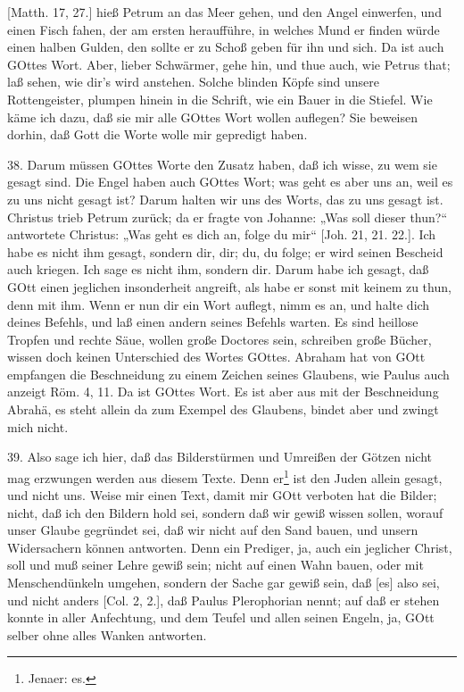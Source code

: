 [Matth. 17, 27.] hieß Petrum an das Meer gehen, und den Angel einwerfen, und einen Fisch fahen, der am ersten heraufführe, in welches Mund er finden würde einen halben Gulden, den sollte er zu Schoß geben für ihn und sich. Da ist auch GOttes Wort. Aber, lieber Schwärmer, gehe hin, und thue auch, wie Petrus that; laß sehen, wie dir’s wird anstehen. Solche blinden Köpfe sind unsere Rottengeister, plumpen hinein in die Schrift, wie ein Bauer in die Stiefel. Wie käme ich dazu, daß sie mir alle GOttes Wort wollen auflegen? Sie beweisen dorhin, daß Gott die Worte wolle mir gepredigt haben.

38. Darum müssen GOttes Worte den Zusatz haben, daß ich wisse, zu wem sie gesagt sind. Die Engel haben auch GOttes Wort; was geht es aber uns an, weil es zu uns nicht gesagt ist? Darum halten wir uns des Worts, das zu uns gesagt ist. Christus trieb Petrum zurück; da er fragte von Johanne: „Was soll dieser thun?“ antwortete Christus: „Was geht es dich an, folge du mir“ [Joh. 21, 21. 22.]. Ich habe es nicht ihm gesagt, sondern dir, dir; du, du folge; er wird seinen Bescheid auch kriegen. Ich sage es nicht ihm, sondern dir. Darum habe ich gesagt, daß GOtt einen jeglichen insonderheit angreift, als habe er sonst mit keinem zu thun, denn mit ihm. Wenn er nun dir ein Wort auflegt, nimm es an, und halte dich deines Befehls, und laß einen andern seines Befehls warten. Es sind heillose Tropfen und rechte Säue, wollen große Doctores sein, schreiben große Bücher, wissen doch keinen Unterschied des Wortes GOttes. Abraham hat von GOtt empfangen die Beschneidung zu einem Zeichen seines Glaubens, wie Paulus auch anzeigt Röm. 4, 11. Da ist GOttes Wort. Es ist aber aus mit der Beschneidung Abrahä, es steht allein da zum Exempel des Glaubens, bindet aber und zwingt mich nicht.

39. Also sage ich hier, daß das Bilderstürmen und Umreißen der Götzen nicht mag erzwungen werden aus diesem Texte. Denn er\footnote{Jenaer: es.} ist den Juden allein gesagt, und nicht uns. Weise mir einen Text, damit mir GOtt verboten hat die Bilder; nicht, daß ich den Bildern hold sei, sondern daß wir gewiß wissen sollen, worauf unser Glaube gegründet sei, daß wir nicht auf den Sand bauen, und unsern Widersachern können
antworten. Denn ein Prediger, ja, auch ein jeglicher Christ, soll und muß seiner Lehre gewiß sein; nicht auf einen Wahn bauen, oder mit Menschendünkeln umgehen, sondern der Sache gar gewiß sein, daß [es] also sei, und nicht anders [Col. 2, 2.], daß Paulus Plerophorian nennt; auf daß er stehen konnte in aller Anfechtung, und dem Teufel und allen seinen Engeln, ja, GOtt selber ohne alles Wanken antworten.

